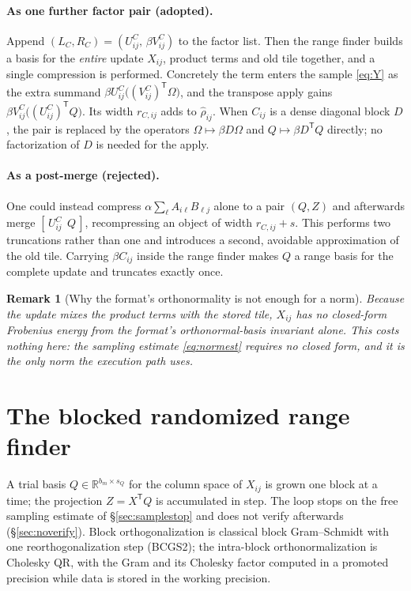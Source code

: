 \documentclass[11pt]{article}
\newtheorem{remark}{Remark}
\newcommand{\R}{\mathbb{R}}
\newcommand{\T}{\mathsf{T}}
\begin{document}
\paragraph{As one further factor pair (adopted).}
Append $(L_C,R_C)=(U^C_{ij},\,\beta V^C_{ij})$ to the factor list. Then the range
finder builds a basis for the \emph{entire} update $X_{ij}$, product terms and
old tile together, and a single compression is performed. Concretely the term
enters the sample \eqref{eq:Y} as the extra summand
$\beta U^C_{ij}\bigl((V^C_{ij})^{\T}\Omega\bigr)$, and the transpose apply gains
$\beta V^C_{ij}\bigl((U^C_{ij})^{\T}Q\bigr)$. Its width $r_{C,ij}$ adds to $\hat\rho_{ij}$. When $C_{ij}$ is a dense diagonal block $D$, the pair is
replaced by the operators
$\Omega\mapsto\beta D\Omega$ and $Q\mapsto\beta D^{\T}Q$ directly; no
factorization of $D$ is needed for the apply.

\paragraph{As a post-merge (rejected).}
One could instead compress $\alpha\sum_\ell A_{i\ell}B_{\ell j}$ alone to a pair
$(Q,Z)$ and afterwards merge $[\,U^C_{ij}\ \ Q\,]$, recompressing an object of
width $r_{C,ij}+s$. This performs two truncations rather than one and introduces
a second, avoidable approximation of the old tile. Carrying $\beta C_{ij}$ inside
the range finder makes $Q$ a range basis for the complete update and truncates
exactly once.

\begin{remark}[Why the format's orthonormality is not enough for a norm]
\label{rem:betanorm}
Because the update mixes the product terms with the stored tile, $X_{ij}$ has no
closed-form Frobenius energy from the format's orthonormal-basis invariant alone.
This costs nothing here: the sampling estimate \eqref{eq:normest} requires no
closed form, and it is the only norm the execution path uses.
\end{remark}

\section{The blocked randomized range finder}
\label{sec:ara}

A trial basis $Q\in\R^{b_m\times s_Q}$ for the column space of $X_{ij}$ is grown
one block at a time; the projection $Z=X^{\T}Q$ is accumulated in step. The loop
stops on the free sampling estimate of \S\ref{sec:samplestop} and does not verify
afterwards (\S\ref{sec:noverify}). Block orthogonalization is classical block
Gram--Schmidt with one reorthogonalization step (BCGS2); the intra-block
orthonormalization is Cholesky QR, with the Gram and its Cholesky factor computed
in a promoted precision while data is stored in the working precision.
\end{document}

